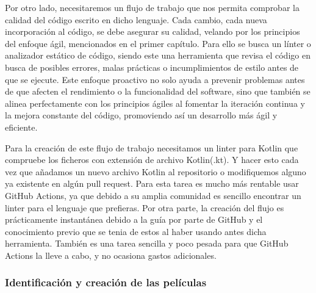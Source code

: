 Por otro lado, necesitaremos un flujo de trabajo que nos permita comprobar la calidad del código escrito en 
dicho lenguaje. Cada cambio, cada nueva incorporación al código, se debe asegurar su calidad, velando por 
los principios del enfoque ágil, mencionados en el primer capítulo. Para ello se busca un línter o 
analizador estático de código, siendo este una herramienta que revisa el código en busca de posibles 
errores, malas prácticas o incumplimientos de estilo antes de que se ejecute. Este enfoque proactivo no solo 
ayuda a prevenir problemas antes de que afecten el rendimiento o la funcionalidad del software, sino que 
también se alinea perfectamente con los principios ágiles al fomentar la iteración continua y la mejora 
constante del código, promoviendo así un desarrollo más ágil y eficiente. 

Para la creación de este flujo de trabajo necesitamos un linter para Kotlin que compruebe los ficheros con 
extensión de archivo Kotlin(.kt). Y hacer esto cada vez que añadamos un nuevo archivo Kotlin al repositorio 
o modifiquemos alguno ya existente en algún pull request. Para esta tarea es mucho más rentable usar GitHub 
Actions, ya que debido a su amplia comunidad es sencillo encontrar un linter para el lenguaje que prefieras. 
Por otra parte, la creación del flujo es prácticamente instantánea debido a la guía por parte de GitHub y el conocimiento previo que se tenia de estos al haber usando antes dicha herramienta. 
También es una tarea sencilla y poco pesada para que GitHub Actions la lleve a cabo, y no ocasiona gastos 
adicionales.

\subsubsection{Identificación y creación de las películas}

